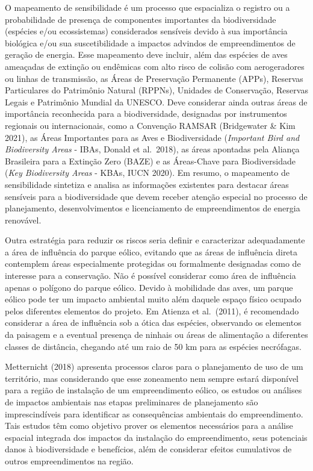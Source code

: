 \documentclass[
  oneside]{scrbook}
\begin{document}
O mapeamento de sensibilidade é um processo que espacializa o registro ou a probabilidade de presença de componentes importantes da biodiversidade (espécies e/ou ecossistemas) considerados sensíveis devido à sua importância biológica e/ou sua suscetibilidade a impactos advindos de empreendimentos de geração de energia. Esse mapeamento deve incluir, além das espécies de aves ameaçadas de extinção ou endêmicas com alto risco de colisão com aerogeradores ou linhas de transmissão, as Áreas de Preservação Permanente (APPs), Reservas Particulares do Patrimônio Natural (RPPNs), Unidades de Conservação, Reservas Legais e Patrimônio Mundial da UNESCO. Deve considerar ainda outras áreas de importância reconhecida para a biodiversidade, designadas por instrumentos regionais ou internacionais, como a Convenção RAMSAR (Bridgewater \& Kim 2021), as Áreas Importantes para as Aves e Biodiversidade (\emph{Important Bird and Biodiversity Areas} - IBAs, Donald et al.~2018), as áreas apontadas pela Aliança Brasileira para a Extinção Zero (BAZE) e as Áreas-Chave para Biodiversidade (\emph{Key Biodiversity Areas} - KBAs, IUCN 2020). Em resumo, o mapeamento de sensibilidade sintetiza e analisa as informações existentes para destacar áreas sensíveis para a biodiversidade que devem receber atenção especial no processo de planejamento, desenvolvimentos e licenciamento de empreendimentos de energia renovável.

Outra estratégia para reduzir os riscos seria definir e caracterizar adequadamente a área de influência do parque eólico, evitando que as áreas de influência direta contemplem áreas especialmente protegidas ou formalmente designadas como de interesse para a conservação. Não é possível considerar como área de influência apenas o polígono do parque eólico. Devido à mobilidade das aves, um parque eólico pode ter um impacto ambiental muito além daquele espaço físico ocupado pelos diferentes elementos do projeto. Em Atienza et al.~(2011), é recomendado considerar a área de influência sob a ótica das espécies, observando os elementos da paisagem e a eventual presença de ninhais ou áreas de alimentação a diferentes classes de distância, chegando até um raio de 50 km para as espécies necrófagas.

Metternicht (2018) apresenta processos claros para o planejamento de uso de um território, mas considerando que esse zoneamento nem sempre estará disponível para a região de instalação de um empreendimento eólico, os estudos ou análises de impactos ambientais nas etapas preliminares de planejamento são imprescindíveis para identificar as consequências ambientais do empreendimento. Tais estudos têm como objetivo prover os elementos necessários para a análise espacial integrada dos impactos da instalação do empreendimento, seus potenciais danos à biodiversidade e benefícios, além de considerar efeitos cumulativos de outros empreendimentos na região.
\end{document}
